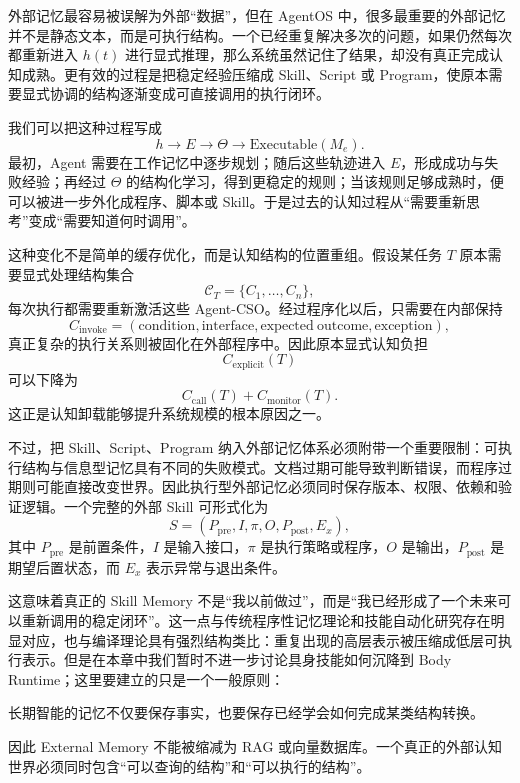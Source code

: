 外部记忆最容易被误解为外部``数据''，但在 AgentOS 中，很多最重要的外部记忆并不是静态文本，而是可执行结构。一个已经重复解决多次的问题，如果仍然每次都重新进入 \(h(t)\) 进行显式推理，那么系统虽然记住了结果，却没有真正完成认知成熟。更有效的过程是把稳定经验压缩成 Skill、Script 或 Program，使原本需要显式协调的结构逐渐变成可直接调用的执行闭环。

我们可以把这种过程写成
\[
h
\rightarrow
E
\rightarrow
\Theta
\rightarrow
\mathrm{Executable}(M_e).
\]
最初，Agent 需要在工作记忆中逐步规划；随后这些轨迹进入 \(E\)，形成成功与失败经验；再经过 \(\Theta\) 的结构化学习，得到更稳定的规则；当该规则足够成熟时，便可以被进一步外化成程序、脚本或 Skill。于是过去的认知过程从``需要重新思考''变成``需要知道何时调用''。

这种变化不是简单的缓存优化，而是认知结构的位置重组。假设某任务 \(T\) 原本需要显式处理结构集合
\[
\mathcal C_T
=
\{C_1,\ldots,C_n\},
\]
每次执行都需要重新激活这些 Agent-CSO。经过程序化以后，只需要在内部保持
\[
C_{\mathrm{invoke}}
=
(\mathrm{condition},
\mathrm{interface},
\mathrm{expected\ outcome},
\mathrm{exception}),
\]
真正复杂的执行关系则被固化在外部程序中。因此原本显式认知负担
\[
C_{\mathrm{explicit}}(T)
\]
可以下降为
\[
C_{\mathrm{call}}(T)
+
C_{\mathrm{monitor}}(T).
\]
这正是认知卸载能够提升系统规模的根本原因之一。

不过，把 Skill、Script、Program 纳入外部记忆体系必须附带一个重要限制：可执行结构与信息型记忆具有不同的失败模式。文档过期可能导致判断错误，而程序过期则可能直接改变世界。因此执行型外部记忆必须同时保存版本、权限、依赖和验证逻辑。一个完整的外部 Skill 可形式化为
\[
S
=
(P_{\mathrm{pre}},
I,
\pi,
O,
P_{\mathrm{post}},
E_x),
\]
其中 \(P_{\mathrm{pre}}\) 是前置条件，\(I\) 是输入接口，\(\pi\) 是执行策略或程序，\(O\) 是输出，\(P_{\mathrm{post}}\) 是期望后置状态，而 \(E_x\) 表示异常与退出条件。

这意味着真正的 Skill Memory 不是``我以前做过''，而是``我已经形成了一个未来可以重新调用的稳定闭环''。这一点与传统程序性记忆理论和技能自动化研究存在明显对应，也与编译理论具有强烈结构类比：重复出现的高层表示被压缩成低层可执行表示。但是在本章中我们暂时不进一步讨论具身技能如何沉降到 Body Runtime；这里要建立的只是一个一般原则：

\begin{proposition*}
长期智能的记忆不仅要保存事实，也要保存已经学会如何完成某类结构转换。
\end{proposition*}

因此 External Memory 不能被缩减为 RAG 或向量数据库。一个真正的外部认知世界必须同时包含``可以查询的结构''和``可以执行的结构''。

